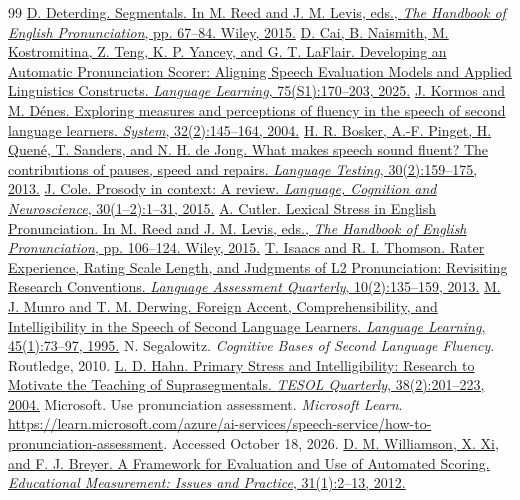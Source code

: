 \documentclass[cameraready]{Interspeech}
\begin{document}
\begin{thebibliography}{99}
 \href{https://doi.org/10.1002/9781118346952.ch4}{D. Deterding. Segmentals. In M. Reed and J. M. Levis, eds., \textit{The Handbook of English Pronunciation}, pp. 67--84. Wiley, 2015.}
 \href{https://doi.org/10.1111/lang.70000}{D. Cai, B. Naismith, M. Kostromitina, Z. Teng, K. P. Yancey, and G. T. LaFlair. Developing an Automatic Pronunciation Scorer: Aligning Speech Evaluation Models and Applied Linguistics Constructs. \textit{Language Learning}, 75(S1):170--203, 2025.}
 \href{https://doi.org/10.1016/j.system.2004.01.001}{J. Kormos and M. D\'enes. Exploring measures and perceptions of fluency in the speech of second language learners. \textit{System}, 32(2):145--164, 2004.}
 \href{https://doi.org/10.1177/0265532212455394}{H. R. Bosker, A.-F. Pinget, H. Quen\'e, T. Sanders, and N. H. de Jong. What makes speech sound fluent? The contributions of pauses, speed and repairs. \textit{Language Testing}, 30(2):159--175, 2013.}
 \href{https://doi.org/10.1080/23273798.2014.963130}{J. Cole. Prosody in context: A review. \textit{Language, Cognition and Neuroscience}, 30(1--2):1--31, 2015.}
 \href{https://doi.org/10.1002/9781118346952.ch6}{A. Cutler. Lexical Stress in English Pronunciation. In M. Reed and J. M. Levis, eds., \textit{The Handbook of English Pronunciation}, pp. 106--124. Wiley, 2015.}
 \href{https://doi.org/10.1080/15434303.2013.769545}{T. Isaacs and R. I. Thomson. Rater Experience, Rating Scale Length, and Judgments of L2 Pronunciation: Revisiting Research Conventions. \textit{Language Assessment Quarterly}, 10(2):135--159, 2013.}
 \href{https://doi.org/10.1111/j.1467-1770.1995.tb00963.x}{M. J. Munro and T. M. Derwing. Foreign Accent, Comprehensibility, and Intelligibility in the Speech of Second Language Learners. \textit{Language Learning}, 45(1):73--97, 1995.}
 N. Segalowitz. \textit{Cognitive Bases of Second Language Fluency}. Routledge, 2010.
 \href{https://doi.org/10.2307/3588378}{L. D. Hahn. Primary Stress and Intelligibility: Research to Motivate the Teaching of Suprasegmentals. \textit{TESOL Quarterly}, 38(2):201--223, 2004.}
 Microsoft. Use pronunciation assessment. \textit{Microsoft Learn}. \url{https://learn.microsoft.com/azure/ai-services/speech-service/how-to-pronunciation-assessment}. Accessed October 18, 2026.
 \href{https://doi.org/10.1111/j.1745-3992.2011.00223.x}{D. M. Williamson, X. Xi, and F. J. Breyer. A Framework for Evaluation and Use of Automated Scoring. \textit{Educational Measurement: Issues and Practice}, 31(1):2--13, 2012.}

\end{thebibliography}
\end{document}

